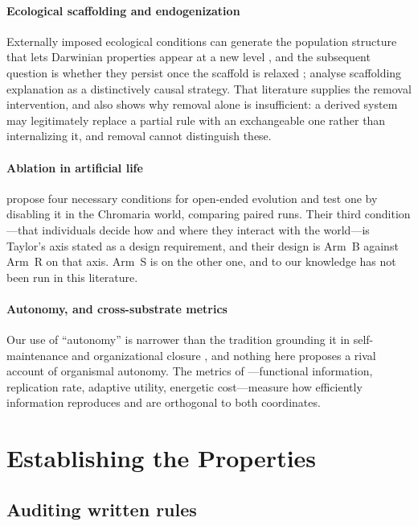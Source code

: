 \documentclass[review,3p,times]{elsarticle}
\begin{document}
\paragraph{Ecological scaffolding and endogenization}
Externally imposed ecological conditions can generate the population structure
that lets Darwinian properties appear at a new level \citep{black2020}, and the
subsequent question is whether they persist once the scaffold is relaxed
\citep{doulcier2024,bourrat2025}; \citet{neto2023} analyse scaffolding
explanation as a distinctively causal strategy. That literature supplies the
removal intervention, and also shows why removal alone is insufficient: a
derived system may legitimately replace a partial rule with an exchangeable one
rather than internalizing it, and removal cannot distinguish these.

\paragraph{Ablation in artificial life}
\citet{soros2014} propose four necessary conditions for open-ended evolution
and test one by disabling it in the Chromaria world, comparing paired runs.
Their third condition---that individuals decide how and where they interact
with the world---is Taylor's axis stated as a design requirement, and their
design is Arm~B against Arm~R on that axis. Arm~S is on the other one, and to
our knowledge has not been run in this literature.

\paragraph{Autonomy, and cross-substrate metrics}
Our use of ``autonomy'' is narrower than the tradition grounding it in
self-maintenance and organizational closure
\citep{ruizmirazo2004a,ruizmirazo2004b,farnsworth2018}, and nothing here
proposes a rival account of organismal autonomy. The metrics of
\citet{gupta2025}---functional information, replication rate, adaptive utility,
energetic cost---measure how efficiently information reproduces and are
orthogonal to both coordinates.

\section{Establishing the Properties}

\subsection{Auditing written rules}
\end{document}
